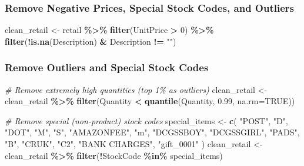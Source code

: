 \documentclass[
]{article}
\newenvironment{Shaded}{\begin{snugshade}}{\end{snugshade}}
\newcommand{\AttributeTok}[1]{\textcolor[rgb]{0.13,0.29,0.53}{#1}}
\newcommand{\CommentTok}[1]{\textcolor[rgb]{0.56,0.35,0.01}{\textit{#1}}}
\newcommand{\ConstantTok}[1]{\textcolor[rgb]{0.56,0.35,0.01}{#1}}
\newcommand{\DecValTok}[1]{\textcolor[rgb]{0.00,0.00,0.81}{#1}}
\newcommand{\FloatTok}[1]{\textcolor[rgb]{0.00,0.00,0.81}{#1}}
\newcommand{\FunctionTok}[1]{\textcolor[rgb]{0.13,0.29,0.53}{\textbf{#1}}}
\newcommand{\NormalTok}[1]{#1}
\newcommand{\OtherTok}[1]{\textcolor[rgb]{0.56,0.35,0.01}{#1}}
\newcommand{\SpecialCharTok}[1]{\textcolor[rgb]{0.81,0.36,0.00}{\textbf{#1}}}
\newcommand{\StringTok}[1]{\textcolor[rgb]{0.31,0.60,0.02}{#1}}
\begin{document}
\subsubsection{Remove Negative Prices, Special Stock Codes, and
Outliers}\label{remove-negative-prices-special-stock-codes-and-outliers}

\begin{Shaded}
\begin{Highlighting}[]
\NormalTok{clean\_retail }\OtherTok{\textless{}{-}}\NormalTok{ retail }\SpecialCharTok{\%\textgreater{}\%}
  \FunctionTok{filter}\NormalTok{(UnitPrice }\SpecialCharTok{\textgreater{}} \DecValTok{0}\NormalTok{) }\SpecialCharTok{\%\textgreater{}\%}
  \FunctionTok{filter}\NormalTok{(}\SpecialCharTok{!}\FunctionTok{is.na}\NormalTok{(Description) }\SpecialCharTok{\&}\NormalTok{ Description }\SpecialCharTok{!=} \StringTok{""}\NormalTok{)}
\end{Highlighting}
\end{Shaded}

\subsubsection{Remove Outliers and Special Stock
Codes}\label{remove-outliers-and-special-stock-codes}

\begin{Shaded}
\begin{Highlighting}[]
\CommentTok{\# Remove extremely high quantities (top 1\% as outliers)}
\NormalTok{clean\_retail }\OtherTok{\textless{}{-}}\NormalTok{ clean\_retail }\SpecialCharTok{\%\textgreater{}\%}
  \FunctionTok{filter}\NormalTok{(Quantity }\SpecialCharTok{\textless{}} \FunctionTok{quantile}\NormalTok{(Quantity, }\FloatTok{0.99}\NormalTok{, }\AttributeTok{na.rm=}\ConstantTok{TRUE}\NormalTok{))}

\CommentTok{\# Remove special (non{-}product) stock codes}
\NormalTok{special\_items }\OtherTok{\textless{}{-}} \FunctionTok{c}\NormalTok{(}
  \StringTok{"POST"}\NormalTok{, }\StringTok{"D"}\NormalTok{, }\StringTok{"DOT"}\NormalTok{, }\StringTok{"M"}\NormalTok{, }\StringTok{"S"}\NormalTok{, }\StringTok{"AMAZONFEE"}\NormalTok{, }\StringTok{"m"}\NormalTok{, }\StringTok{"DCGSSBOY"}\NormalTok{,}
  \StringTok{"DCGSSGIRL"}\NormalTok{, }\StringTok{"PADS"}\NormalTok{, }\StringTok{"B"}\NormalTok{, }\StringTok{"CRUK"}\NormalTok{, }\StringTok{"C2"}\NormalTok{, }\StringTok{"BANK CHARGES"}\NormalTok{, }\StringTok{"gift\_0001"}
\NormalTok{)}
\NormalTok{clean\_retail }\OtherTok{\textless{}{-}}\NormalTok{ clean\_retail }\SpecialCharTok{\%\textgreater{}\%}
  \FunctionTok{filter}\NormalTok{(}\SpecialCharTok{!}\NormalTok{StockCode }\SpecialCharTok{\%in\%}\NormalTok{ special\_items)}
\end{Highlighting}
\end{Shaded}
\end{document}
